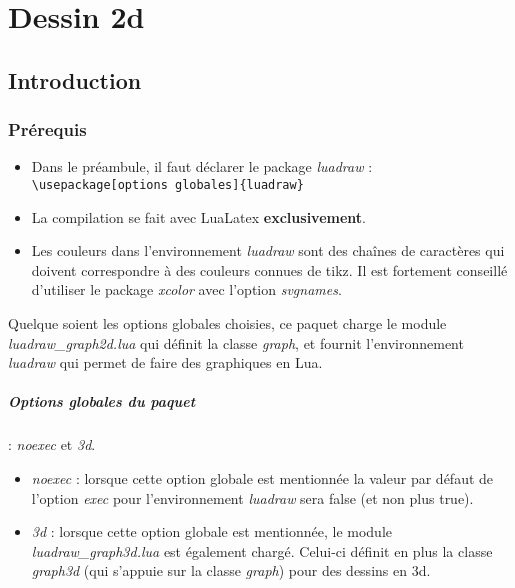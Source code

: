 \chapter{Dessin 2d}

\begin{center}
%
\par
{}
\end{center}

\section{Introduction}

\subsection{Prérequis}

\begin{itemize}
\item Dans le préambule, il faut déclarer le package \emph{luadraw} : \verb|\usepackage[options globales]{luadraw}|
\item La compilation se fait avec LuaLatex \textbf{exclusivement}.
\item Les couleurs dans l'environnement \emph{luadraw} sont des chaînes de caractères qui doivent correspondre à des couleurs connues de tikz. Il est fortement conseillé d'utiliser le package \emph{xcolor} avec l'option \emph{svgnames}.
\end{itemize}

Quelque soient les options globales choisies, ce paquet charge le module \emph{luadraw\_graph2d.lua} qui définit la classe \emph{graph}, et fournit l'environnement \emph{luadraw} qui permet de faire des graphiques en Lua.

\paragraph{Options globales du paquet} : \emph{noexec} et \emph{3d}.

\begin{itemize}
    \item \emph{noexec} : lorsque cette option globale est mentionnée la valeur par défaut de l'option \emph{exec} pour l'environnement \emph{luadraw} sera false (et non plus true).
    \item \emph{3d} : lorsque cette option globale est mentionnée, le module \emph{luadraw\_graph3d.lua} est également chargé. Celui-ci définit en plus la classe \emph{graph3d} (qui s'appuie sur la classe \emph{graph}) pour des dessins en 3d. 
\end{itemize}

